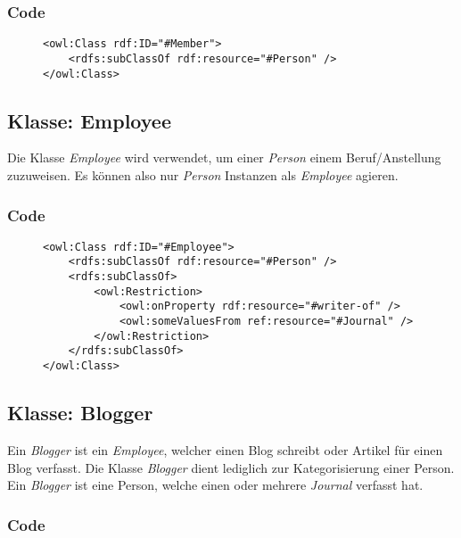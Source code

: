 \documentclass[
    11pt,
    latin1,
    a4paper,
    oneside
]{scrreprt}
\begin{document}
\subsubsection{Code} \label{sec:class_member_code}

\begin{figure}[h]
 \lstset{language=XML}
 \begin{lstlisting}[label=owl:word]
<owl:Class rdf:ID="#Member">
    <rdfs:subClassOf rdf:resource="#Person" />
</owl:Class>
 \end{lstlisting}
\end{figure}


\subsection{Klasse: Employee} \label{sec:class_employee}

Die Klasse \emph{Employee} wird verwendet, um einer \emph{Person} einem Beruf/Anstellung zuzuweisen. Es k\"onnen also nur \emph{Person} Instanzen als \emph{Employee} agieren.

\subsubsection{Code} \label{sec:class_employee_code}

\begin{figure}[h]
 \lstset{language=XML}
 \begin{lstlisting}[label=owl:word]
<owl:Class rdf:ID="#Employee">
	<rdfs:subClassOf rdf:resource="#Person" />
	<rdfs:subClassOf>
		<owl:Restriction>
			<owl:onProperty rdf:resource="#writer-of" />
			<owl:someValuesFrom ref:resource="#Journal" />
		</owl:Restriction>
	</rdfs:subClassOf>
</owl:Class>
 \end{lstlisting}
\end{figure}


\subsection{Klasse: Blogger} \label{sec:class_blogger}

Ein \emph{Blogger} ist ein \emph{Employee}, welcher einen Blog schreibt oder Artikel f\"ur einen Blog verfasst. Die Klasse \emph{Blogger} dient lediglich zur Kategorisierung einer Person. Ein \emph{Blogger} ist eine Person, welche einen oder mehrere \emph{Journal} verfasst hat.

\subsubsection{Code} \label{sec:class_blogger_code}
\end{document}
